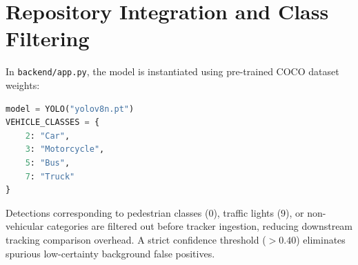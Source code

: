 \section{Repository Integration and Class Filtering}
In \texttt{backend/app.py}, the model is instantiated using pre-trained COCO dataset weights:
\begin{lstlisting}[language=Python]
model = YOLO("yolov8n.pt")
VEHICLE_CLASSES = {
    2: "Car",
    3: "Motorcycle",
    5: "Bus",
    7: "Truck"
}
\end{lstlisting}
Detections corresponding to pedestrian classes ($0$), traffic lights ($9$), or non-vehicular categories are filtered out before tracker ingestion, reducing downstream tracking comparison overhead. A strict confidence threshold ($> 0.40$) eliminates spurious low-certainty background false positives.
